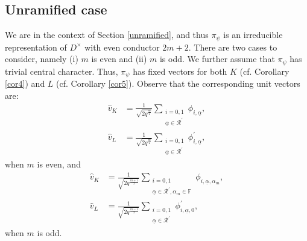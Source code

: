 \documentclass[12pt]{amsart}
\theoremstyle{definition}
\theoremstyle{remark}
\begin{document}
\subsection{Unramified case}

We are in the context of Section \ref{unramified}, and thus $\pi_\psi$ is an irreducible representation of $D^\times$ with even conductor $2m+2$. There are two cases to consider, namely (i) $m$ is even and (ii) $m$ is odd. We further assume that $\pi_\psi$ has trivial central character. Thus, $\pi_\psi$ has fixed vectors for both $K$ (cf. Corollary \ref{cor4}) and $L$ (cf. Corollary \ref{cor5}). Observe that the corresponding unit vectors are:
\begin{align*}
\hat{v}_K &= \frac{1}{\sqrt{2 q^{\frac{m}{2}}} } \sum\limits_{\substack{i=0,1 \\  \underline{\alpha} \in \mathcal{R}^\prime  }} \phi_{i,\underline{\alpha}}, \\
\hat{v}_L &= \frac{1}{\sqrt{2 q^{\frac{m}{2}}} } \sum\limits_{\substack{i=0,1 \\  \underline{\alpha} \in \mathcal{R}^\prime  }} \phi_{i,\underline{\alpha}}^\prime,
\end{align*}
when $m$ is even, and
\begin{align*}
\hat{v}_K &= \frac{1}{\sqrt{2 q^{\frac{m+1}{2}}} } \sum\limits_{\substack{i=0,1 \\  \underline{\alpha} \in \mathcal{R}^\prime ,\alpha_m \in \mathbb F }} \phi_{i,\underline{\alpha}, \alpha_m}, \\
\hat{v}_L &= \frac{1}{\sqrt{2 q^{\frac{m-1}{2}}} } \sum\limits_{\substack{i=0,1 \\  \underline{\alpha} \in \mathcal{R}^\prime }} \phi_{i,\underline{\alpha}, 0}^\prime,
\end{align*}
when $m$ is odd. 
\end{document}
